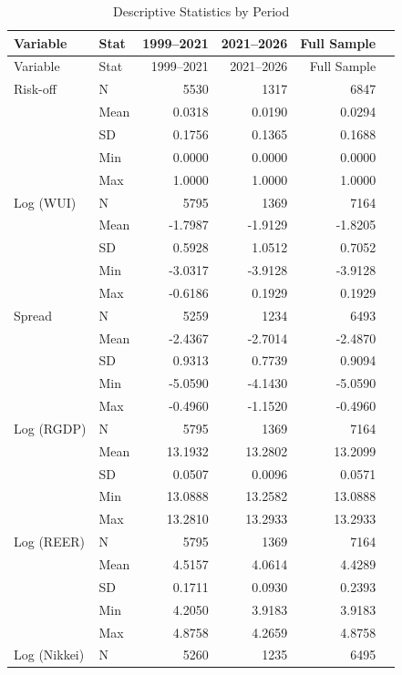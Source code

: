 \FloatBarrier
\begin{longtable}{@{}l l r r r r@{}}
  \caption{Descriptive Statistics by Period} \label{tab:desc} \\
  \toprule
  Variable & Stat & 1999--2021 & 2021--2026 & Full Sample \\
  \midrule
  \endfirsthead
  \toprule
  Variable & Stat & 1999--2021 & 2021--2026 & Full Sample \\
  \midrule
  \endhead
  \bottomrule
  \endlastfoot
  \small
Risk-off & N & 5530 & 1317 & 6847 \\
 & Mean & 0.0318 & 0.0190 & 0.0294 \\
 & SD & 0.1756 & 0.1365 & 0.1688 \\
 & Min & 0.0000 & 0.0000 & 0.0000 \\
 & Max & 1.0000 & 1.0000 & 1.0000 \\
\addlinespace
Log (WUI) & N & 5795 & 1369 & 7164 \\
 & Mean & -1.7987 & -1.9129 & -1.8205 \\
 & SD & 0.5928 & 1.0512 & 0.7052 \\
 & Min & -3.0317 & -3.9128 & -3.9128 \\
 & Max & -0.6186 & 0.1929 & 0.1929 \\
\addlinespace
Spread & N & 5259 & 1234 & 6493 \\
 & Mean & -2.4367 & -2.7014 & -2.4870 \\
 & SD & 0.9313 & 0.7739 & 0.9094 \\
 & Min & -5.0590 & -4.1430 & -5.0590 \\
 & Max & -0.4960 & -1.1520 & -0.4960 \\
\addlinespace
Log (RGDP) & N & 5795 & 1369 & 7164 \\
 & Mean & 13.1932 & 13.2802 & 13.2099 \\
 & SD & 0.0507 & 0.0096 & 0.0571 \\
 & Min & 13.0888 & 13.2582 & 13.0888 \\
 & Max & 13.2810 & 13.2933 & 13.2933 \\
\addlinespace
Log (REER) & N & 5795 & 1369 & 7164 \\
 & Mean & 4.5157 & 4.0614 & 4.4289 \\
 & SD & 0.1711 & 0.0930 & 0.2393 \\
 & Min & 4.2050 & 3.9183 & 3.9183 \\
 & Max & 4.8758 & 4.2659 & 4.8758 \\
\addlinespace
Log (Nikkei) & N & 5260 & 1235 & 6495 \\

\end{longtable}
